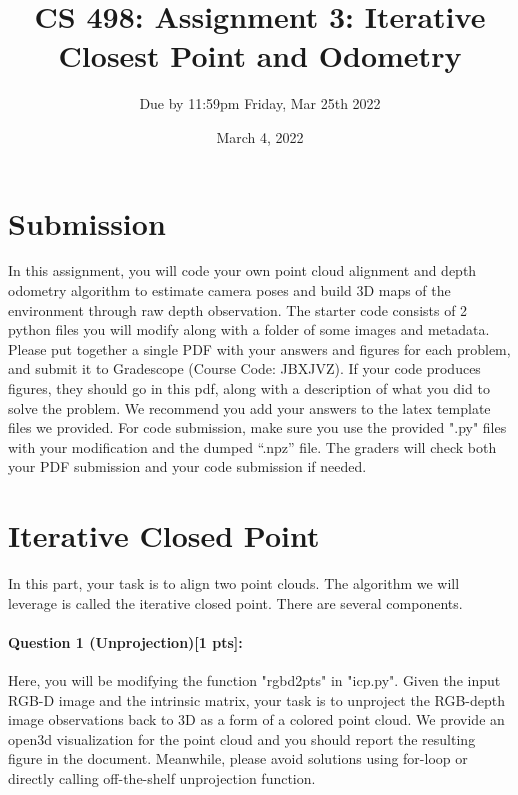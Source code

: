 \documentclass[11pt]{article}
\begin{document}
\author{Due by 11:59pm Friday, Mar 25th 2022}
\title{CS 498: Assignment 3: Iterative Closest Point and Odometry}
\date{March 4, 2022}
\maketitle

\medskip


\section*{Submission}
In this assignment, you will code your own point cloud alignment and depth odometry algorithm to estimate camera poses and build 3D maps of the environment through raw depth observation. The starter code consists of 2 python files you will modify along with a folder of some images and metadata. Please put together a single PDF with your answers and figures for each problem, and submit it to Gradescope (Course Code: JBXJVZ). If your code produces figures, they should go in this pdf, along with a description of what you did to solve the problem. We recommend you add your answers to the latex template files we provided. For code submission, make sure you use the provided ".py" files with your modification and the dumped ``.npz'' file. The graders will check both your PDF submission and your code submission if needed. 

\section*{Iterative Closed Point} 

In this part, your task is to align two point clouds. The algorithm we will leverage is called the iterative closed point. There are several components. 

\paragraph{Question 1 (Unprojection)[1 pts]:} Here, you will be modifying the function "rgbd2pts" in "icp.py". Given the input RGB-D image and the intrinsic matrix, your task is to unproject the RGB-depth image observations back to 3D as a form of a colored point cloud. We provide an open3d visualization for the point cloud and you should report the resulting figure in the document. Meanwhile, please avoid solutions using for-loop or directly calling off-the-shelf unprojection function.
\end{document}
